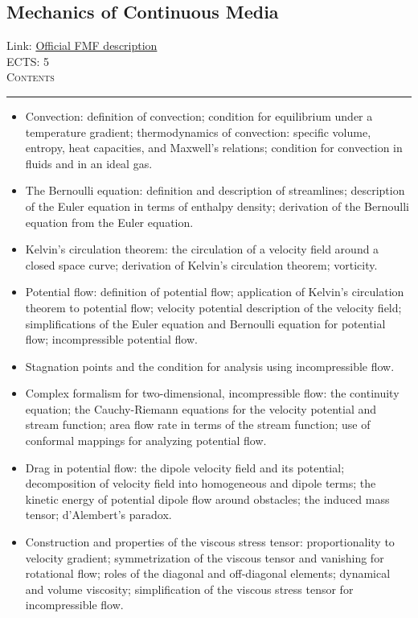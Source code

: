 \documentclass[11pt, a4paper]{article}
\newenvironment{course}[3]{
\subsection{#1}%
Link: \href{#2}{Official FMF description}\\%
ECTS: #3%
\vspace{1ex}
\\
{\large \textsc{Contents}}\\[-0.9ex]%
\rule{\textwidth}{0.5pt}
\vspace{-3ex}
}
{}
\newenvironment{chapter}[1]{
\begin{tcolorbox}[title=#1, breakable]
}
{\end{tcolorbox}}
\begin{document}
\begin{course}{Mechanics of Continuous Media}{https://www.fmf.uni-lj.si/en/study-physics/programmes/1fiz/2020/7000777/courses/1160/}{5}
\begin{chapter}{Mechanics of ideal fluids}
\begin{itemize}
            \item Convection: definition of convection; condition for equilibrium under a temperature gradient; thermodynamics of convection: specific volume, entropy, heat capacities, and Maxwell's relations; condition for convection in fluids and in an ideal gas.

            \item The Bernoulli equation: definition and description of streamlines; description of the Euler equation in terms of enthalpy density; derivation of the Bernoulli equation from the Euler equation.

            \item Kelvin's circulation theorem: the circulation of a velocity field around a closed space curve; derivation of Kelvin's circulation theorem; vorticity.

            \item Potential flow: definition of potential flow; application of Kelvin's circulation theorem to potential flow; velocity potential description of the velocity field; simplifications of the Euler equation and Bernoulli equation for potential flow; incompressible potential flow.

            \item Stagnation points and the condition for analysis using incompressible flow.

            \item Complex formalism for two-dimensional, incompressible flow: the continuity equation; the Cauchy-Riemann equations for the velocity potential and stream function; area flow rate in terms of the stream function; use of conformal mappings for analyzing potential flow.

            \item Drag in potential flow: the dipole velocity field and its potential; decomposition of velocity field into homogeneous and dipole terms; the kinetic energy of potential dipole flow around obstacles; the induced mass tensor; d'Alembert's paradox.
        
        \end{itemize}
    \end{chapter}

    \begin{chapter}{Mechanics of viscous fluids}
        \begin{itemize}
            \item Construction and properties of the viscous stress tensor: proportionality to velocity gradient; symmetrization of the viscous tensor and vanishing for rotational flow; roles of the diagonal and off-diagonal elements; dynamical and volume viscosity; simplification of the viscous stress tensor for incompressible flow.


\end{itemize}
\end{chapter}
\end{course}
\end{document}
